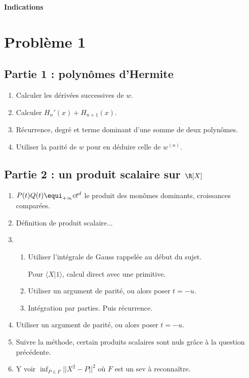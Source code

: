 \documentclass[twoside,french,10pt]{VcCours}
\begin{document}

\begin{center}
	\textbf{\Large Indications}
\end{center}
	
\separationTitre

\section*{Problème 1}

\subsection*{Partie 1 : polynômes d'Hermite}

\begin{enumerate}
	\item Calculer les dérivées successives de $w$.
	\item Calculer $H_n'(x)+H_{n+1}(x)$.
	\item Récurrence, degré et terme dominant d'une somme de deux polynômes.
	\item Utiliser la parité de $w$ pour en déduire celle de $w^{(n)}$.
\end{enumerate}

\subsection*{Partie 2 : un produit scalaire sur $\R[X]$}

\begin{enumerate}
	\item $P(t)Q(t)\equi_{+\infty}ct^d$ le produit des monômes dominants, croissances comparées.
	\item Définition de produit scalaire...
	\item 
	\begin{enumerate}
		\item Utiliser l'intégrale de Gauss rappelée au début du sujet.
	
		Pour $\langle X|1\rangle$, calcul direct avec une primitive.
		\item Utiliser un argument de parité, ou alors poser $t=-u$.
		\item Intégration par parties. Puis récurrence.
	\end{enumerate}
	\item Utiliser un argument de parité, ou alors poser $t=-u$.
	\item Suivre la méthode, certain produits scalaires sont nuls grâce à la question précédente.
	\item Y voir $\inf_{P\in F}||X^2-P||^2$ où $F$ est un sev à reconnaître.
\end{enumerate}
 
\end{document}
